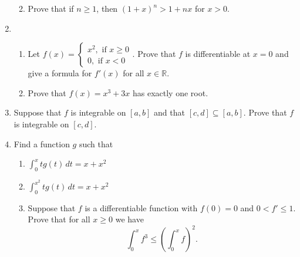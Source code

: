 \documentclass[12pt]{article}
\newcommand{\points}[1]{\marginpar{\hspace{24pt}[#1]}}
\newcommand{\R}{\mathbb{R}}
\begin{document}
\begin{enumerate}
\begin{enumerate}
\vspace{4in}

       \item Prove that if $n\geq 1$, then $(1+x)^n>1+nx$ for $x>0$. \points{5}
\end{enumerate}

\newpage
\item  \begin{enumerate}
       \item Let $f(x) = \begin{cases} x^2, \text{ if } x\geq 0\\ 0, \text{ if } x<0\end{cases}$. \points{5} Prove that $f$ is differentiable at $x=0$ and give a formula for $f'(x)$ for all $x\in\R$.

\vspace{3.5in}

       \item Prove that $f(x) = x^3+3x$ has exactly one root. \points{5}
      \end{enumerate}
\newpage

\item Suppose that $f$ is integrable on $[a,b]$ and that $[c,d]\subseteq [a,b]$. Prove that $f$ is integrable on $[c,d]$. \points{10}

\newpage

 \item Find a function $g$ such that
\begin{enumerate}
 \item  $\displaystyle\int_0^x tg(t)\,dt = x+x^2$ \points{3}

\vspace{2in}
 
\item  $\displaystyle\int_0^{x^2} tg(t) \,dt = x+x^2$ \points{3}

\vspace{2in}

\item Suppose that $f$ is a differentiable function with $f(0)=0$ and $0<f'\leq 1$. Prove that for all $x\geq 0$ we have \points{4}
\[
 \int_0^x f^3\leq \left(\int_0^x f\right)^2.
\]


\end{enumerate}


\end{enumerate}
\end{document}
